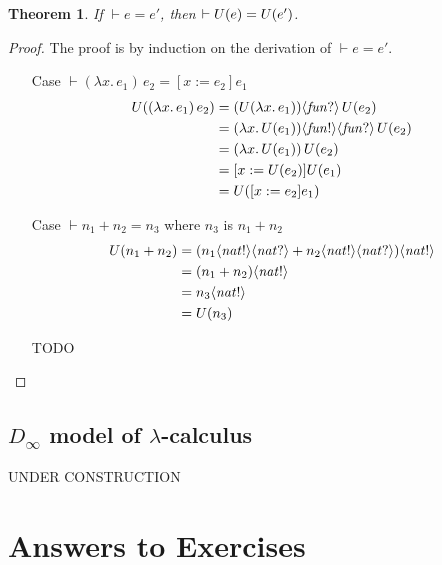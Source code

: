 \documentclass{tufte-handout}
\newcommand{\LAM}[1]{\lambda #1.\,}
\newcommand{\APP}[0]{\,}
\newtheorem{theorem}{Theorem}%
\begin{document}
\begin{theorem}
If $\vdash e = e'$, then $\vdash U(e) = U(e')$.
\end{theorem}
\begin{proof}
The proof is by induction on the derivation of $\vdash e = e'$.
\begin{itemize}
\item[Case] $\vdash (\LAM{x}e_1)\APP e_2 = [ x := e_2 ]e_1$
  \begin{align*}
    \uni{(\LAM{x}e_1)\APP e_2}
        &= \coerce{(\uni{\LAM{x}e_1})}{\mathit{fun}?} \APP \uni{e_2}\\
        &= \coerce{\coerce{(\LAM{x}\uni{e_1})}{\mathit{fun}!}}{\mathit{fun}?} \APP \uni{e_2}\\
        &= (\LAM{x}\uni{e_1}) \APP \uni{e_2}\\
        &= [x:=\uni{e_2}]\uni{e_1} \\
        &= \uni{[x:=e_2]e_1} 
  \end{align*}
\item[Case $\vdash n_1 + n_2 = n_3$ where $n_3$ is $n_1 + n_2$]
\begin{align*}
  U(n_1+n_2) &= 
     (n_1\langle \mathit{nat}!\rangle\langle \mathit{nat}?\rangle +
              n_2\langle \mathit{nat}!\rangle\langle \mathit{nat}?\rangle)\langle \mathit{nat}!\rangle \\
  &= (n_1 + n_2)\langle \mathit{nat}!\rangle \\
  &= n_3\langle \mathit{nat}!\rangle \\
  &= U(n_3) 
\end{align*}
\item[TODO]
\end{itemize}
\end{proof}

\subsection{$D_\infty$ model of $\lambda$-calculus}
\label{sec:D-infinity}

UNDER CONSTRUCTION



\clearpage
\pagebreak

\section*{Answers to Exercises}

\shipoutAnswer

\clearpage
\pagebreak



\end{document}

